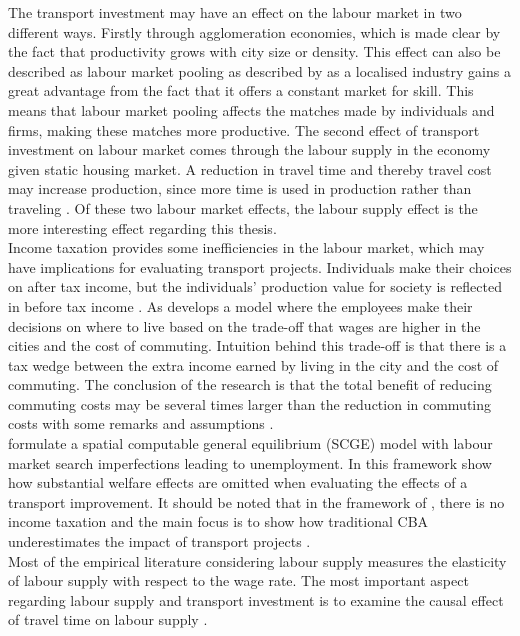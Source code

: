 \documentclass[a4paper, 12 pt]{article}   	%
\begin{document}
The transport investment may have an effect on the labour market in two different ways. Firstly through agglomeration economies, which is made clear by the fact that productivity grows with city size or density. \citep{andersson} This effect can also be described as labour market pooling as described by \cite{marshall} as a localised industry gains a great advantage from the fact that it offers a constant market for skill. This means that labour market pooling affects the matches made by individuals and firms, making these matches more productive. The second effect of transport investment on labour market comes through the labour supply in the economy given static housing market. A reduction in travel time and thereby travel cost may increase production, since more time is used in production rather than traveling \citep{andersson}. Of these two labour market effects, the labour supply effect is the more interesting effect regarding this thesis. \\

Income taxation provides some inefficiencies in the labour market, which may have implications for evaluating transport projects. Individuals make their choices on after tax income, but the individuals' production value for society is reflected in before tax income \citep{andersson}. As \cite{venables2007} develops a model where the employees make their decisions on where to live based on the trade-off that wages are higher in the cities and the cost of commuting. Intuition behind this trade-off is that there is a tax wedge between the extra income earned by living in the city and the cost of commuting. The conclusion of the research is that the total benefit of reducing commuting costs may be several times larger than the reduction in commuting costs with some remarks and assumptions \citep{venables2007}. \\

\cite{pilegaard} formulate a spatial computable general equilibrium (SCGE) model with labour market search imperfections leading to unemployment. In this framework \cite{pilegaard} show how substantial welfare effects are omitted when evaluating the effects of a transport improvement. It should be noted that in the framework of \cite{pilegaard}, there is no income taxation and the main focus is to show how traditional CBA underestimates the impact of transport projects \citep{andersson}. \\

Most of the empirical literature considering labour supply measures the elasticity of labour supply with respect to the wage rate. The most important aspect regarding labour supply and transport investment is to examine the causal effect of travel time on labour supply \citep{andersson}. \\
\end{document}
